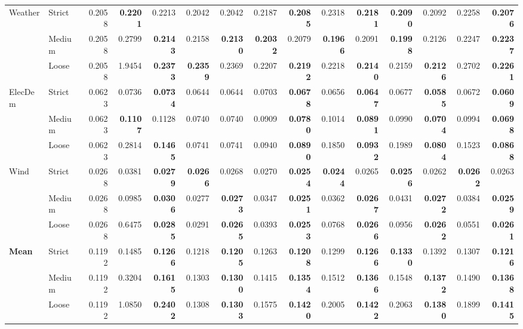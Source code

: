 \begin{tabular*}{\textwidth}{@{\extracolsep{\fill}}llr*{6}{rr}@{}}
Weather & Strict & 0.2058 & \textbf{0.2201} & 0.2213 & 0.2042 & 0.2042 & 0.2187 & \textbf{0.2085} & 0.2318 & \textbf{0.2181} & \textbf{0.2090} & 0.2092 & 0.2258 & \textbf{0.2076} \\
 & Medium & 0.2058 & 0.2799 & \textbf{0.2143} & 0.2158 & \textbf{0.2130} & \textbf{0.2032} & 0.2079 & \textbf{0.1966} & 0.2091 & \textbf{0.1998} & 0.2126 & 0.2247 & \textbf{0.2237} \\
 & Loose & 0.2058 & 1.9454 & \textbf{0.2373} & \textbf{0.2359} & 0.2369 & 0.2207 & \textbf{0.2192} & 0.2218 & \textbf{0.2140} & 0.2159 & \textbf{0.2126} & 0.2702 & \textbf{0.2261} \\
ElecDem & Strict & 0.0623 & 0.0736 & \textbf{0.0734} & 0.0644 & 0.0644 & 0.0703 & \textbf{0.0678} & 0.0656 & \textbf{0.0647} & 0.0677 & \textbf{0.0585} & 0.0672 & \textbf{0.0609} \\
 & Medium & 0.0623 & \textbf{0.1107} & 0.1128 & 0.0740 & 0.0740 & 0.0909 & \textbf{0.0780} & 0.1014 & \textbf{0.0891} & 0.0990 & \textbf{0.0704} & 0.0994 & \textbf{0.0698} \\
 & Loose & 0.0623 & 0.2814 & \textbf{0.1465} & 0.0741 & 0.0741 & 0.0940 & \textbf{0.0890} & 0.1850 & \textbf{0.0932} & 0.1989 & \textbf{0.0804} & 0.1523 & \textbf{0.0868} \\
Wind & Strict & 0.0268 & 0.0381 & \textbf{0.0279} & \textbf{0.0266} & 0.0268 & 0.0270 & \textbf{0.0254} & \textbf{0.0244} & 0.0265 & \textbf{0.0256} & 0.0262 & \textbf{0.0262} & 0.0263 \\
 & Medium & 0.0268 & 0.0985 & \textbf{0.0306} & 0.0277 & \textbf{0.0273} & 0.0347 & \textbf{0.0251} & 0.0362 & \textbf{0.0267} & 0.0431 & \textbf{0.0272} & 0.0384 & \textbf{0.0259} \\
 & Loose & 0.0268 & 0.6475 & \textbf{0.0285} & 0.0291 & \textbf{0.0265} & 0.0393 & \textbf{0.0253} & 0.0768 & \textbf{0.0266} & 0.0956 & \textbf{0.0262} & 0.0551 & \textbf{0.0261} \\
\cmidrule(lr){1-15}
\textbf{Mean} & Strict & 0.1192 & 0.1485 & \textbf{0.1266} & 0.1218 & \textbf{0.1205} & 0.1263 & \textbf{0.1208} & 0.1299 & \textbf{0.1266} & \textbf{0.1330} & 0.1392 & 0.1307 & \textbf{0.1216} \\
 & Medium & 0.1192 & 0.3204 & \textbf{0.1615} & 0.1303 & \textbf{0.1300} & 0.1415 & \textbf{0.1354} & 0.1512 & \textbf{0.1366} & 0.1548 & \textbf{0.1372} & 0.1490 & \textbf{0.1368} \\
 & Loose & 0.1192 & 1.0850 & \textbf{0.2402} & 0.1308 & \textbf{0.1303} & 0.1575 & \textbf{0.1420} & 0.2005 & \textbf{0.1422} & 0.2063 & \textbf{0.1380} & 0.1899 & \textbf{0.1415} \\

\end{tabular*}
